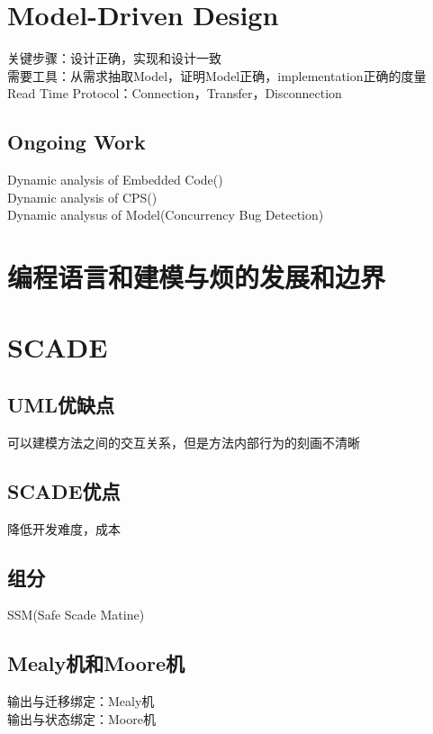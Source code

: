 \documentclass{article}
\begin{document}
\begin{CJK}{UTF8}{gbsn}
	
	
	\section{Model-Driven Design}
	关键步骤：设计正确，实现和设计一致\\
	需要工具：从需求抽取Model，证明Model正确，implementation正确的度量\\
	
	Read Time Protocol：Connection，Transfer，Disconnection\\
	
	\subsection{Ongoing Work}
	Dynamic analysis of Embedded Code()\\
	Dynamic analysis of CPS()\\
	Dynamic analysus of Model(Concurrency Bug Detection)\\
	
	\section{编程语言和建模与烦的发展和边界}
	
	
	
	\section{SCADE}
	\subsection*{UML优缺点}
	可以建模方法之间的交互关系，但是方法内部行为的刻画不清晰\\
	\subsection{SCADE优点}
	降低开发难度，成本\\
	\subsection{组分}
	SSM(Safe Scade Matine)\\
	
	\subsection{Mealy机和Moore机}
	输出与迁移绑定：Mealy机\\
	输出与状态绑定：Moore机\\
	

\end{CJK}
\end{document}
